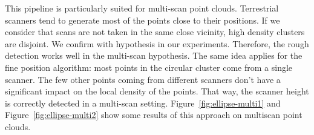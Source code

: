 This pipeline is particularly suited for multi-scan point clouds. Terrestrial scanners tend to generate most of the points close to their positions. If we consider that scans are not taken in the same close vicinity, high density clusters are disjoint. We confirm with hypothesis in our experiments. Therefore, the rough detection works well in the multi-scan hypothesis. The same idea applies for the fine position algorithm: most points in the circular cluster come from a single scanner. The few
other points coming from different scanners don’t have a significant impact on the local density of the points. That way, the scanner height is correctly detected in a multi-scan setting. Figure~\ref{fig:ellipse-multi1} and Figure~\ref{fig:ellipse-multi2} show some results of this approach on multiscan point clouds.

